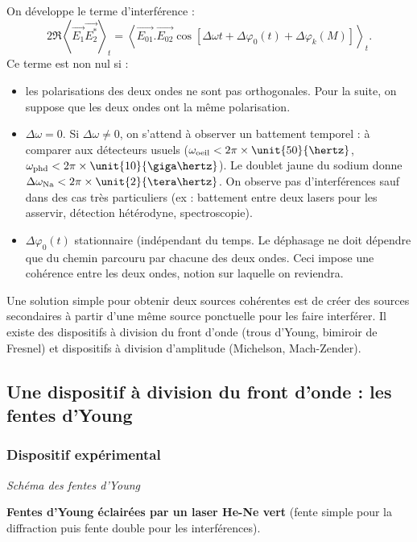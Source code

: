 On développe le terme d'interférence :
\begin{equation}
2\Re \left< \overrightarrow{E_1} \overrightarrow{E_2^*} \right>_t =
\left<
\overrightarrow{E_{01}}.\overrightarrow{E_{02}}
\cos\left[ \Delta \omega t + \Delta \varphi_0(t) + \Delta\varphi_k(M)\right]
\right>_t.
\end{equation}
Ce terme est non nul si :
\begin{itemize}
\item les polarisations des deux ondes ne sont pas orthogonales.
Pour la suite, on suppose que les deux ondes ont la même polarisation.
\item  $\Delta\omega = 0$.
Si $\Delta\omega \neq 0$, on s'attend à observer un battement temporel : à comparer aux détecteurs usuels ($\omega_\mathrm{oeil} < 2\pi\times\unit{50}{\hertz}$, $\omega_\mathrm{phd} < 2\pi\times\unit{10}{\giga\hertz}$).
Le doublet jaune du sodium donne $\Delta\omega_\mathrm{Na} < 2\pi\times\unit{2}{\tera\hertz}$.
On observe pas d'interférences sauf dans des cas très particuliers (ex : battement entre deux lasers pour les asservir, détection hétérodyne, spectroscopie).
\item $\Delta\varphi_0(t)$ stationnaire (indépendant du temps.
Le déphasage ne doit dépendre que du chemin parcouru par chacune des deux ondes.
Ceci impose une cohérence entre les deux ondes, notion sur laquelle on reviendra.
\end{itemize}

\begin{transition}
Une solution simple pour obtenir deux sources cohérentes est de créer des sources secondaires à partir d'une même source ponctuelle pour les faire interférer. 
Il existe des dispositifs à division du front d'onde (trous d'Young, bimiroir de Fresnel) et dispositifs à division d'amplitude (Michelson, Mach-Zender).
\end{transition}

\subsection{Une dispositif à division du front d'onde : les fentes d'Young}

\subsubsection{Dispositif expérimental}

\emph{Schéma des fentes d'Young}

\begin{experience}
\textbf{Fentes d'Young éclairées par un laser He-Ne vert}
(fente simple pour la diffraction puis fente double pour les interférences).
\end{experience}

